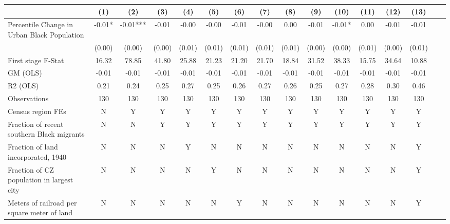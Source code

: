  \begin{tabular}{l*{15}{c}} \toprule
                    &\multicolumn{1}{c}{(1)}   &\multicolumn{1}{c}{(2)}   &\multicolumn{1}{c}{(3)}   &\multicolumn{1}{c}{(4)}   &\multicolumn{1}{c}{(5)}   &\multicolumn{1}{c}{(6)}   &\multicolumn{1}{c}{(7)}   &\multicolumn{1}{c}{(8)}   &\multicolumn{1}{c}{(9)}   &\multicolumn{1}{c}{(10)}   &\multicolumn{1}{c}{(11)}   &\multicolumn{1}{c}{(12)}   &\multicolumn{1}{c}{(13)}   \\
\midrule
Percentile Change in Urban Black Population& -0.01*  & -0.01***& -0.01   & -0.00   & -0.00   & -0.01   & -0.00   &  0.00   & -0.01   & -0.01*  &  0.00   & -0.01   & -0.01   \\
                    &(0.00)   &(0.00)   &(0.00)   &(0.01)   &(0.01)   &(0.01)   &(0.01)   &(0.01)   &(0.00)   &(0.00)   &(0.01)   &(0.00)   &(0.01)   \\
\midrule
First stage F-Stat  & 16.32   & 78.85   & 41.80   & 25.88   & 21.23   & 21.20   & 21.70   & 18.84   & 31.52   & 38.33   & 15.75   & 34.64   & 10.88   \\
GM (OLS)            & -0.01   & -0.01   & -0.01   & -0.01   & -0.01   & -0.01   & -0.01   & -0.01   & -0.01   & -0.01   & -0.01   & -0.01   & -0.01   \\
R2 (OLS)            &  0.21   &  0.24   &  0.25   &  0.27   &  0.25   &  0.26   &  0.27   &  0.26   &  0.25   &  0.27   &  0.28   &  0.30   &  0.46   \\
Observations        &   130   &   130   &   130   &   130   &   130   &   130   &   130   &   130   &   130   &   130   &   130   &   130   &   130   \\
Census region FEs   &     N   &     Y   &     Y   &     Y   &     Y   &     Y   &     Y   &     Y   &     Y   &     Y   &     Y   &     Y   &     Y   \\
Fraction of recent southern Black migrants&     N   &     N   &     Y   &     Y   &     Y   &     Y   &     Y   &     Y   &     Y   &     Y   &     Y   &     Y   &     Y   \\
Fraction of land incorporated, 1940&     N   &     N   &     N   &     Y   &     N   &     N   &     N   &     N   &     N   &     N   &     N   &     N   &     Y   \\
Fraction of CZ population in largest city&     N   &     N   &     N   &     N   &     Y   &     N   &     N   &     N   &     N   &     N   &     N   &     N   &     Y   \\
Meters of railroad per square meter of land&     N   &     N   &     N   &     N   &     N   &     Y   &     N   &     N   &     N   &     N   &     N   &     N   &     Y   \\

\end{tabular}

